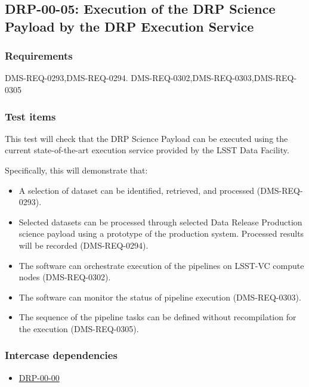 \subsection{DRP-00-05: Execution of the DRP Science Payload by the DRP Execution Service}
\label{drp-00-05}

\subsubsection{Requirements}

DMS-REQ-0293,DMS-REQ-0294.
DMS-REQ-0302,DMS-REQ-0303,DMS-REQ-0305

\subsubsection{Test items}

This test will check that the DRP Science Payload can be executed using the current state-of-the-art execution service provided by the LSST Data Facility.

Specifically, this will demonstrate that:

\begin{itemize}

  \item{A selection of dataset can be identified, retrieved, and processed (DMS-REQ-0293).}
  \item{Selected datasets can be processed through selected Data Release Production science payload using a prototype of the production system. Processed results will be recorded (DMS-REQ-0294).}
  \item{The software can orchestrate execution of the pipelines on LSST-VC compute nodes (DMS-REQ-0302).}
  \item{The software can monitor the status of pipeline execution (DMS-REQ-0303).}
  \item{The sequence of the pipeline tasks can be defined without recompilation for the execution (DMS-REQ-0305).}
\end{itemize}

\subsubsection{Intercase dependencies}

\begin{itemize}

  \item{\hyperref[drp-00-00]{DRP-00-00}}

\end{itemize}

